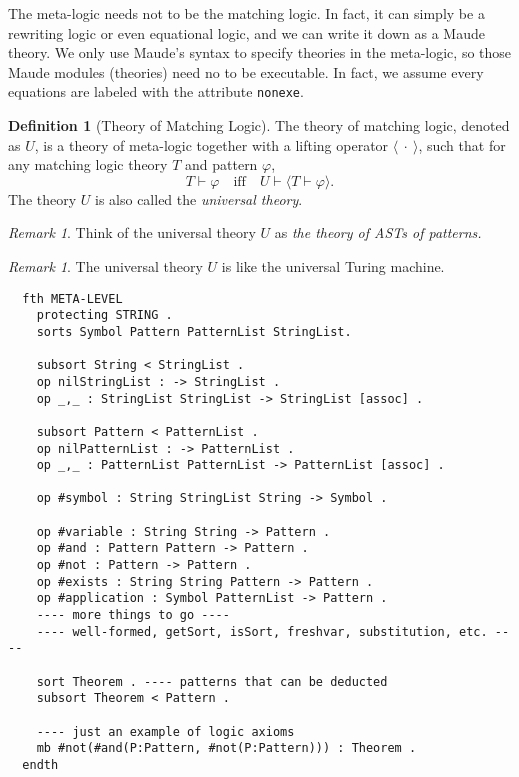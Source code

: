 \documentclass[UTF8]{article}
\newcounter{thmcounter}
\theoremstyle{plain}
\theoremstyle{definition}
\newtheorem{definition}[thmcounter]{Definition}
\theoremstyle{remark}
\newtheorem{remark}[thmcounter]{Remark}
\begin{document}
The meta-logic needs not to be the matching logic. In fact, it can simply be a rewriting logic or even equational logic, and we can write it down as a Maude theory. We only use Maude's syntax to specify theories in the meta-logic, so those Maude modules (theories) need no to be executable. In fact, we assume every equations are labeled with the attribute \texttt{nonexe}.
\newline

\begin{definition}[Theory of Matching Logic]
	The theory of matching logic, denoted as $U$, is a theory of meta-logic together with a lifting operator $\langle \ \cdot \ \rangle$, such that for any matching logic theory $T$ and pattern $\varphi$, 
	\begin{equation*}
	T \vdash \varphi \quad \text{iff} \quad U \vdash \langle T \vdash \varphi \rangle.
	\end{equation*}
	The theory $U$ is also called the \emph{universal theory}. 
\end{definition}



\begin{remark}
	Think of the universal theory $U$ as \emph{the theory of ASTs of patterns.}
\end{remark}
\begin{remark}
	The universal theory $U$ is like the universal Turing machine.
\end{remark}

\begin{Verbatim}
  fth META-LEVEL
    protecting STRING .
    sorts Symbol Pattern PatternList StringList.
    
    subsort String < StringList .
    op nilStringList : -> StringList .
    op _,_ : StringList StringList -> StringList [assoc] .
    
    subsort Pattern < PatternList .
    op nilPatternList : -> PatternList .
    op _,_ : PatternList PatternList -> PatternList [assoc] .
    
    op #symbol : String StringList String -> Symbol .
    
    op #variable : String String -> Pattern .
    op #and : Pattern Pattern -> Pattern .
    op #not : Pattern -> Pattern .
    op #exists : String String Pattern -> Pattern .
    op #application : Symbol PatternList -> Pattern .
    ---- more things to go ----
    ---- well-formed, getSort, isSort, freshvar, substitution, etc. ----
    
    sort Theorem . ---- patterns that can be deducted
    subsort Theorem < Pattern .
    
    ---- just an example of logic axioms
    mb #not(#and(P:Pattern, #not(P:Pattern))) : Theorem . 
  endth
\end{Verbatim}
\end{document}
